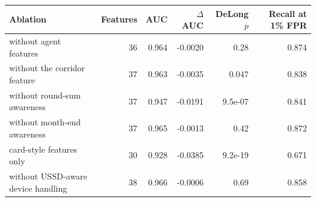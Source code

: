\begin{tabular}{lrrrrr}
\toprule
Ablation & Features & AUC & $\Delta$AUC & DeLong $p$ & Recall at 1\% FPR \\
\midrule
without agent features & 36 & 0.964 & -0.0020 & 0.28 & 0.874 \\
without the corridor feature & 37 & 0.963 & -0.0035 & 0.047 & 0.838 \\
without round-sum awareness & 37 & 0.947 & -0.0191 & 9.5e-07 & 0.841 \\
without month-end awareness & 37 & 0.965 & -0.0013 & 0.42 & 0.872 \\
card-style features only & 30 & 0.928 & -0.0385 & 9.2e-19 & 0.671 \\
without USSD-aware device handling & 38 & 0.966 & -0.0006 & 0.69 & 0.858 \\
\bottomrule
\end{tabular}
